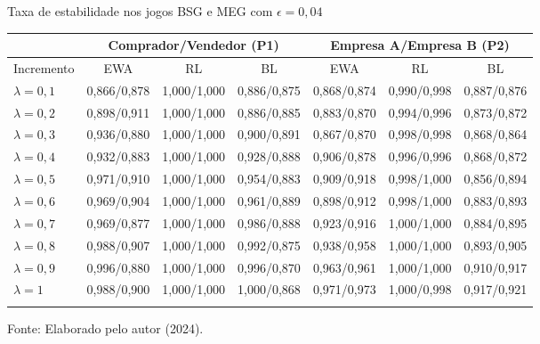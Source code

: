 \begin{tabela}[H]
	\small
	\centering
	\caption{Taxa de estabilidade nos jogos BSG e MEG com $\epsilon = 0,04$}
	\begin{tabular}{l|c c c|c c c}
		\Xhline{2\arrayrulewidth}
		& \multicolumn{3}{c|}{Comprador/Vendedor (P1)} & \multicolumn{3}{c}{Empresa A/Empresa B (P2)} \\ 
		\hline
		Incremento & EWA & RL & BL & EWA & RL & BL \\ \hline
		$\lambda = 0,1$ & 0,866/0,878 & 1,000/1,000 & 0,886/0,875 & 0,868/0,874 & 0,990/0,998 & 0,887/0,876 \\
		$\lambda = 0,2$ & 0,898/0,911 & 1,000/1,000 & 0,886/0,885 & 0,883/0,870 & 0,994/0,996 & 0,873/0,872 \\
		$\lambda = 0,3$ & 0,936/0,880 & 1,000/1,000 & 0,900/0,891 & 0,867/0,870 & 0,998/0,998 & 0,868/0,864 \\
		$\lambda = 0,4$ & 0,932/0,883 & 1,000/1,000 & 0,928/0,888 & 0,906/0,878 & 0,996/0,996 & 0,868/0,872 \\
		$\lambda = 0,5$ & 0,971/0,910 & 1,000/1,000 & 0,954/0,883 & 0,909/0,918 & 0,998/1,000 & 0,856/0,894 \\
		$\lambda = 0,6$ & 0,969/0,904 & 1,000/1,000 & 0,961/0,889 & 0,898/0,912 & 0,998/1,000 & 0,883/0,893 \\
		$\lambda = 0,7$ & 0,969/0,877 & 1,000/1,000 & 0,986/0,888 & 0,923/0,916 & 1,000/1,000 & 0,884/0,895 \\
		$\lambda = 0,8$ & 0,988/0,907 & 1,000/1,000 & 0,992/0,875 & 0,938/0,958 & 1,000/1,000 & 0,893/0,905 \\
		$\lambda = 0,9$ & 0,996/0,880 & 1,000/1,000 & 0,996/0,870 & 0,963/0,961 & 1,000/1,000 & 0,910/0,917 \\
		$\lambda = 1$ & 0,988/0,900 & 1,000/1,000 & 1,000/0,868 & 0,971/0,973 & 1,000/0,998 & 0,917/0,921 \\
		\Xhline{2\arrayrulewidth}
	\end{tabular}
	\label{tabela_13}
	\caption*{\fontsize{10}{12}\selectfont Fonte: Elaborado pelo autor (2024).}
\end{tabela}
